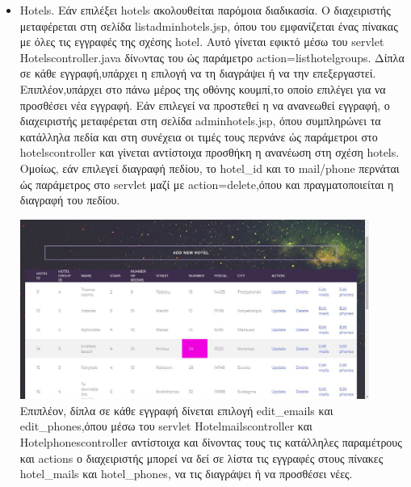 \documentclass[a4paper,oneside, 11pt]{article}
\begin{document}
\begin{enumerate}
\begin{itemize}
\item Hotels. \bigbreak 
Εάν επιλέξει hotels ακολουθείται παρόμοια διαδικασία. Ο διαχειριστής μεταφέρεται στη σελίδα listadminhotels.jsp, όπου του εμφανίζεται ένας πίνακας με όλες τις εγγραφές της σχέσης hotel. Αυτό γίνεται εφικτό μέσω του servlet Hotelscontroller.java δίνoντας του ώς παράμετρο action=listhotelgroups. Δίπλα σε κάθε εγγραφή,υπάρχει η επιλογή να τη διαγράψει ή να την επεξεργαστεί. Επιπλέον,υπάρχει στο πάνω μέρος της οθόνης κουμπί,το οποίο επιλέγει για να προσθέσει νέα εγγραφή. Εάν επιλεγεί να προστεθεί η να ανανεωθεί εγγραφή, ο διαχειριστής μεταφέρεται στη σελίδα adminhotels.jsp, όπου συμπληρώνει τα κατάλληλα πεδία και στη συνέχεια  οι τιμές τους περνάνε ώς παράμετροι στο hotelscontroller και γίνεται αντίστοιχα προσθήκη η ανανέωση στη σχέση hotels. Ομοίως, εάν επιλεγεί διαγραφή πεδίου, το hotel\_id  και το mail/phone περνάται ώς παράμετρος στο servlet μαζί με action=delete,όπου και πραγματοποιείται η διαγραφή του πεδίου. \bigbreak 

\includegraphics[width=0.9\textwidth]{hoteltables.jpg}
\bigbreak
Επιπλέον, δίπλα σε κάθε εγγραφή δίνεται επιλογή edit\_emails και edit\_phones,όπου μέσω του servlet Hotelmailscontroller και Hotelphonescontroller αντίστοιχα  και δίνοντας τους τις κατάλληλες παραμέτρους και actions ο διαχειριστής μπορεί να δεί σε λίστα τις εγγραφές στους πίνακες hotel\_mails και hotel\_phones, να τις διαγράψει ή να προσθέσει νέες.



\end{itemize}
\end{enumerate}
\end{document}
